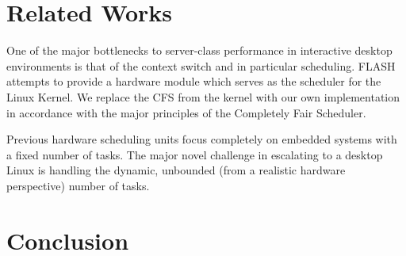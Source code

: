 \documentclass{sig-alternate-10pt}
\begin{document}


\section{Related Works}
One of the major bottlenecks to server-class performance in interactive
desktop environments is that of the context switch and in particular
scheduling.  FLASH attempts to provide a hardware module which serves as the
scheduler for the Linux Kernel.  We replace the CFS from the kernel with our
own implementation in accordance with the major principles of the Completely
Fair Scheduler\cite{wong2008cfs}.

Previous hardware scheduling units focus completely on embedded systems with
a fixed number of tasks\cite{nakano1995hardware, morton2004hardware,
nacul2007hardware, kuacharoen2003configurable, park2008hardware}.  The major
novel challenge in escalating to a desktop Linux is handling the dynamic,
unbounded (from a realistic hardware perspective) number of tasks.


\section{Conclusion}
\lipsum[1]

\nocite{*}
{
	
	
}
\end{document}

